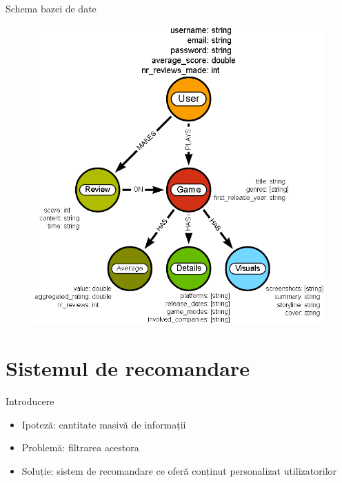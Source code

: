 \documentclass{beamer}
\begin{document}
\begin{frame}{Schema bazei de date}
    \begin{figure}[H]
        \centering
        \begin{adjustbox}{max size={\textwidth}{\textheight}}
        \includegraphics[scale = 0.3]{exemplu_4}
        \end{adjustbox}
    \end{figure}
\end{frame}

\section{Sistemul de recomandare}
\frame{\tableofcontents[currentsection]}
\begin{frame}{Introducere}
 
    \begin{itemize}
        \item Ipoteză: cantitate masivă de informații
        \item Problemă: filtrarea acestora
        \item Soluție: sistem de recomandare ce oferă conținut personalizat utilizatorilor
    \end{itemize}
\end{frame}
\end{document}

